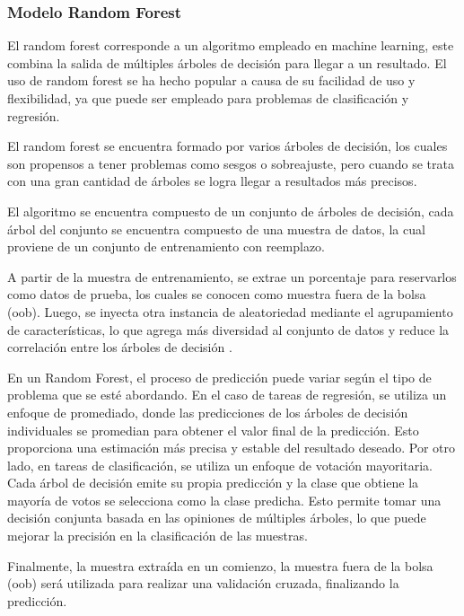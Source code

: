 \subsubsection{Modelo Random Forest}
El random forest corresponde a un algoritmo empleado en machine learning, este combina la salida de múltiples árboles de decisión para llegar a un resultado. El uso de random forest se ha hecho popular a causa de su facilidad de uso y flexibilidad, ya que puede ser empleado para problemas de clasificación y regresión.

El random forest se encuentra formado por varios árboles de decisión, los cuales son propensos a tener problemas como sesgos o sobreajuste, pero cuando se trata con una gran cantidad de árboles se logra llegar a resultados más precisos.

El algoritmo se encuentra compuesto de un conjunto de árboles de decisión, cada árbol del conjunto se encuentra compuesto de una muestra de datos, la cual proviene de un conjunto de entrenamiento con reemplazo.

A partir de la muestra de entrenamiento, se extrae un porcentaje para reservarlos como datos de prueba, los cuales se conocen como muestra fuera de la bolsa (oob). Luego, se inyecta otra instancia de aleatoriedad mediante el agrupamiento de características, lo que agrega más diversidad al conjunto de datos y reduce la correlación entre los árboles de decisión \cite{random-forest}.

En un Random Forest, el proceso de predicción puede variar según el tipo de problema que se esté abordando. En el caso de tareas de regresión, se utiliza un enfoque de promediado, donde las predicciones de los árboles de decisión individuales se promedian para obtener el valor final de la predicción. Esto proporciona una estimación más precisa y estable del resultado deseado. Por otro lado, en tareas de clasificación, se utiliza un enfoque de votación mayoritaria. Cada árbol de decisión emite su propia predicción y la clase que obtiene la mayoría de votos se selecciona como la clase predicha. Esto permite tomar una decisión conjunta basada en las opiniones de múltiples árboles, lo que puede mejorar la precisión en la clasificación de las muestras.

Finalmente, la muestra extraída en un comienzo, la muestra fuera de la bolsa (oob) será utilizada para realizar una validación cruzada, finalizando la predicción.

